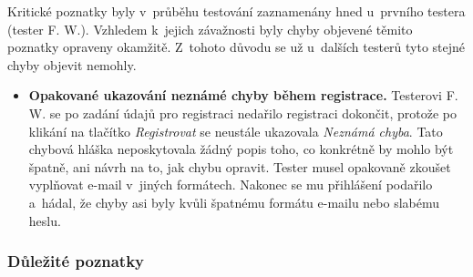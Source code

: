 Kritické poznatky byly v~průběhu testování zaznamenány hned u~prvního testera (tester F. W.). Vzhledem k~jejich závažnosti byly chyby objevené těmito poznatky opraveny okamžitě. Z~tohoto důvodu se už u~dalších testerů tyto stejné chyby objevit nemohly.

\begin{itemize}
\item\textbf{Opakované ukazování neznámé chyby během registrace.} Testerovi F. W. se po zadání údajů pro registraci nedařilo registraci dokončit, protože po klikání na tlačítko \emph{Registrovat} se neustále ukazovala \emph{Neznámá chyba}. Tato chybová hláška neposkytovala žádný popis toho, co konkrétně by mohlo být špatně, ani návrh na to, jak chybu opravit. Tester musel opakovaně zkoušet vyplňovat e-mail v~jiných formátech. Nakonec se mu přihlášení podařilo a~hádal, že chyby asi byly kvůli špatnému formátu e-mailu nebo slabému heslu.
\end{itemize}

\subsubsection{Důležité poznatky}

